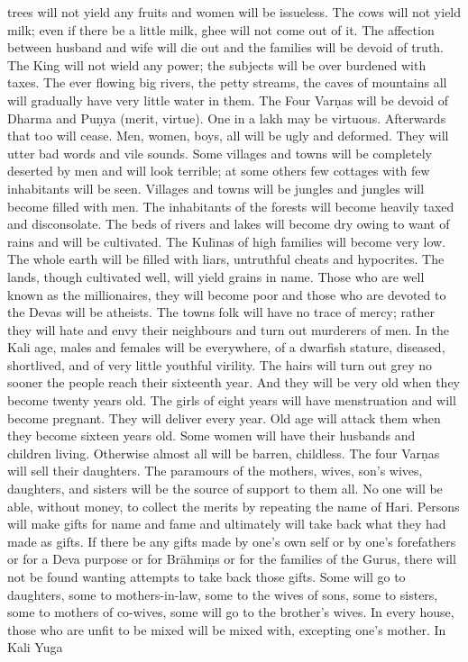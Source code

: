 trees will not yield any fruits and women will be issueless. The cows will not yield milk; even if there be a little milk, ghee will not come out of it. The affection between husband and wife will die out and the families will be devoid of truth. The King will not wield any power; the subjects will be over burdened with taxes. The ever flowing big rivers, the petty streams, the caves of mountains all will gradually have very little water in them. The Four Var\d{n}as will be devoid of Dharma and Pu\d{n}ya (merit, virtue). One in a lakh may be virtuous. Afterwards that too will cease. Men, women, boys, all will be ugly and deformed. They will utter bad words and vile sounds. Some villages and towns will be completely deserted by men and will look terrible; at some others few cottages with few inhabitants will be seen. Villages and towns will be jungles and jungles will become filled with men. The inhabitants of the forests will become heavily taxed and disconsolate. The beds of rivers and lakes will become dry owing to want of rains and will be cultivated. The Kul\={\i}nas of high families will become very low. The whole earth will be filled with liars, untruthful cheats and hypocrites. The lands, though cultivated well, will yield grains in name. Those who are well known as the millionaires, they will become poor and those who are devoted to the Devas will be atheists. The towns folk will have no trace of mercy; rather they will hate and envy their neighbours and turn out murderers of men. In the Kali age, males and females will be everywhere, of a dwarfish stature, diseased, shortlived, and of very little youthful virility. The hairs will turn out grey no sooner the people reach their sixteenth year. And they will be very old when they become twenty years old. The girls of eight years will have menstruation and will become pregnant. They will deliver every year. Old age will attack them when they become sixteen years old. Some women will have their husbands and children living. Otherwise almost all will be barren, childless. The four Var\d{n}as will sell their daughters. The paramours of the mothers, wives, son's wives, daughters, and sisters will be the source of support to them all. No one will be able, without money, to collect the merits by repeating the name of Hari. Persons will make gifts for name and fame and ultimately will take back what they had made as gifts. If there be any gifts made by one's own self or by one's forefathers or for a Deva purpose or for Br\=ahmi\d{n}s or for the families of the Gurus, there will not be found wanting attempts to take back those gifts. Some will go to daughters, some to mothers-in-law, some to the wives of sons, some to sisters, some to mothers of co-wives, some will go to the brother's wives. In every house, those who are unfit to be mixed will be mixed with, excepting one's mother. In Kali Yuga


